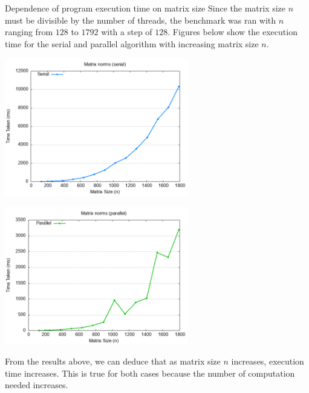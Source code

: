 \documentclass[12pt]{article}
\begin{document}
\begin{section}{Dependence of program execution time on matrix size}
 Since the matrix size $n$ must be divisible by the number of threads, the benchmark was ran with $n$ ranging from
 $128$ to $1792$ with a step of $128$. Figures below show the execution time for the serial and parallel algorithm with
 increasing matrix size $n$.

 \begin{center}
     \begin{minipage}{0.48\linewidth}
         \includegraphics*[width=8cm]{images/benchmark_serial.png}
     \end{minipage}
     \begin{minipage}{0.48\linewidth}
         \includegraphics*[width=8cm]{images/benchmark_parallel.png}
     \end{minipage}
 \end{center}

 From the results above, we can deduce that as matrix size $n$ increases, execution time increases. This is true for both cases because
 the number of computation needed increases.

\end{section}

\pagebreak
\end{document}
